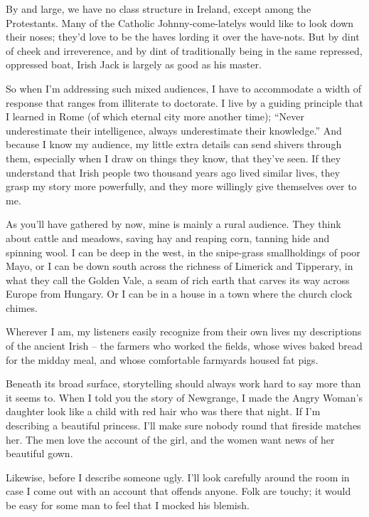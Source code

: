 \documentclass[openany]{memoir}
\begin{document}
By and large, we have no class structure in Ireland, except among the Protestants.
Many of the Catholic Johnny-come-latelys would like to look down their noses; they'd love to be the haves lording it over the have-nots.
But by dint of cheek and irreverence, and by dint of traditionally being in the same repressed, oppressed boat, Irish Jack is largely as good as his master.

So when I'm addressing such mixed audiences, I have to accommodate a width of response that ranges from illiterate to doctorate.
I live by a guiding principle that I learned in Rome (of which eternal city more another time); ``Never underestimate their intelligence, always underestimate their knowledge.'' And because I know my audience, my little extra details can send shivers through them, especially when I draw on things they know, that they've seen.
If they understand that Irish people two thousand years ago lived similar lives, they grasp my story more powerfully, and they more willingly give themselves over to me.

As you'll have gathered by now, mine is mainly a rural audience.
They think about cattle and meadows, saving hay and reaping corn, tanning hide and spinning wool.
I can be deep in the west, in the snipe-grass smallholdings of poor Mayo, or I can be down south across the richness of Limerick and Tipperary, in what they call the Golden Vale, a seam of rich earth that carves its way across Europe from Hungary.
Or I can be in a house in a town where the church clock chimes.

Wherever I am, my listeners easily recognize from their own lives my descriptions of the ancient Irish -- the farmers who worked the fields, whose wives baked bread for the midday meal, and whose comfortable farmyards housed fat pigs.

\vspace{1em}

\noindent Beneath its broad surface, storytelling should always work hard to say more than it seems to.
When I told you the story of Newgrange, I made the Angry Woman's daughter look like a child with red hair who was there that night.
If I'm describing a beautiful princess.
I'll make sure nobody round that fireside matches her.
The men love the account of the girl, and the women want news of her beautiful gown.

Likewise, before I describe someone ugly.
I'll look carefully around the room in case I come out with an account that offends anyone.
Folk are touchy; it would be easy for some man to feel that I mocked his blemish.
\end{document}
